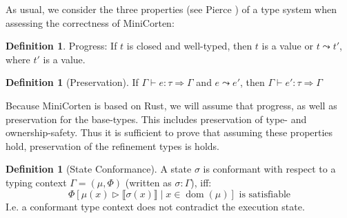 \documentclass[twoside, english]{sdqthesis}
\newcommand{\bbracket}[1]{\llbracket #1 \rrbracket}
\DeclareMathOperator{\dom}{dom}
\theoremstyle{definition}
\newtheorem{definition}[theorem]{Definition}
\begin{document}
As usual, we consider the three properties (see Pierce \cite[p. 95, p.167]{pierce_types_2002}) of a type system when assessing the correctness of MiniCorten:

\begin{definition}
  Progress:
    If $t$ is closed and well-typed, then $t$ is a value or $t \leadsto t'$, where $t'$ is a value.
\end{definition}

\begin{definition}[Preservation]
  If $\Gamma \vdash e : \tau \Rightarrow \Gamma$ and $e \leadsto e'$, then $\Gamma \vdash e' : \tau \Rightarrow \Gamma$
\end{definition}

Because MiniCorten is based on Rust, we will assume that progress, as well as preservation for the base-types. This includes preservation of type- and ownership-safety. Thus it is sufficient to prove that assuming these properties hold, preservation of the refinement types is holds.

\begin{definition}[State Conformance]\label{def:state-conformance}
  A state $\sigma$ is conformant with respect to a typing context $\Gamma = (\mu, \Phi)$ (written as $\sigma : \Gamma$), iff:
  $$
    \Phi[\mu(x) \triangleright \bbracket{\sigma(x)} \mid x \in \dom(\mu)] \text{ is satisfiable}
  $$
  I.e. a conformant type context does not contradict the execution state.
\end{definition}
\end{document}
